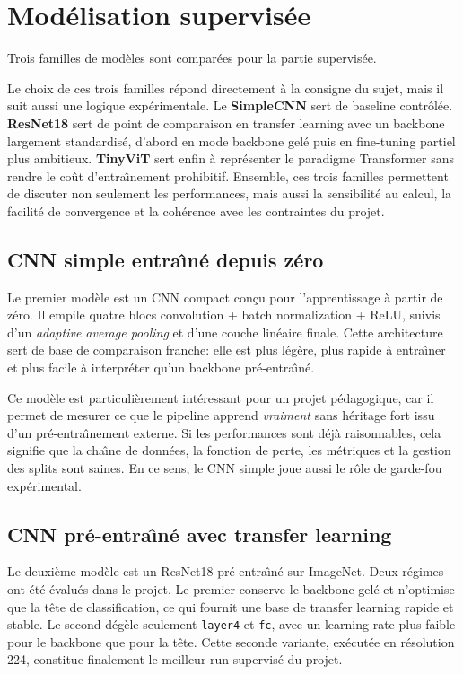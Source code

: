 \documentclass[11pt,a4paper]{article}
\newif\ifsectionbreakenabled
\let\oldsection\section
\renewcommand{\section}[1]{%
    \ifsectionbreakenabled
        \clearpage
    \else
        \sectionbreakenabledtrue
    \fi
    \oldsection{#1}%
}
\begin{document}
\section{Mod\'elisation supervis\'ee}
Trois familles de mod\`eles sont compar\'ees pour la partie supervis\'ee.

Le choix de ces trois familles r\'epond directement \`a la consigne du sujet, mais il suit aussi une logique exp\'erimentale. Le \textbf{SimpleCNN} sert de baseline contr\^ol\'ee. \textbf{ResNet18} sert de point de comparaison en transfer learning avec un backbone largement standardis\'e, d'abord en mode backbone gel\'e puis en fine-tuning partiel plus ambitieux. \textbf{TinyViT} sert enfin \`a repr\'esenter le paradigme Transformer sans rendre le co\^ut d'entra\^\i nement prohibitif. Ensemble, ces trois familles permettent de discuter non seulement les performances, mais aussi la sensibilit\'e au calcul, la facilit\'e de convergence et la coh\'erence avec les contraintes du projet.

\subsection{CNN simple entra\^\i n\'e depuis z\'ero}
Le premier mod\`ele est un CNN compact con\c{c}u pour l'apprentissage \`a partir de z\'ero. Il empile quatre blocs convolution + batch normalization + ReLU, suivis d'un \emph{adaptive average pooling} et d'une couche lin\'eaire finale. Cette architecture sert de base de comparaison franche: elle est plus l\'eg\`ere, plus rapide \`a entra\^\i ner et plus facile \`a interpr\'eter qu'un backbone pr\'e-entra\^\i n\'e.

Ce mod\`ele est particuli\`erement int\'eressant pour un projet p\'edagogique, car il permet de mesurer ce que le pipeline apprend \emph{vraiment} sans h\'eritage fort issu d'un pr\'e-entra\^\i nement externe. Si les performances sont d\'ej\`a raisonnables, cela signifie que la cha\^\i ne de donn\'ees, la fonction de perte, les m\'etriques et la gestion des splits sont saines. En ce sens, le CNN simple joue aussi le r\^ole de garde-fou exp\'erimental.

\subsection{CNN pr\'e-entra\^\i n\'e avec transfer learning}
Le deuxi\`eme mod\`ele est un ResNet18 \cite{he2016resnet} pr\'e-entra\^\i n\'e sur ImageNet. Deux r\'egimes ont \'et\'e \'evalu\'es dans le projet. Le premier conserve le backbone gel\'e et n'optimise que la t\^ete de classification, ce qui fournit une base de transfer learning rapide et stable. Le second d\'eg\`ele seulement \texttt{layer4} et \texttt{fc}, avec un learning rate plus faible pour le backbone que pour la t\^ete. Cette seconde variante, ex\'ecut\'ee en r\'esolution 224, constitue finalement le meilleur run supervis\'e du projet.
\end{document}
